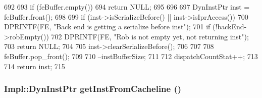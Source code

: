 \begin{DoxyCode}
692 {
693     if (feBuffer.empty()) {
694         return NULL;
695     }
696 
697     DynInstPtr inst = feBuffer.front();
698 
699     if (inst->isSerializeBefore() || inst->isIprAccess()) {
700         DPRINTF(FE, "Back end is getting a serialize before inst\n");
701         if (!backEnd->robEmpty()) {
702             DPRINTF(FE, "Rob is not empty yet, not returning inst\n");
703             return NULL;
704         }
705         inst->clearSerializeBefore();
706     }
707 
708     feBuffer.pop_front();
709 
710     --instBufferSize;
711 
712     dispatchCountStat++;
713 
714     return inst;
715 }
\end{DoxyCode}
\hypertarget{classFrontEnd_a11bf7511e73a68b32e7ce600e2ef1bdc}{
\subsubsection[{getInstFromCacheline}]{\setlength{\rightskip}{0pt plus 5cm}Impl::DynInstPtr getInstFromCacheline ()}}
\label{classFrontEnd_a11bf7511e73a68b32e7ce600e2ef1bdc}



